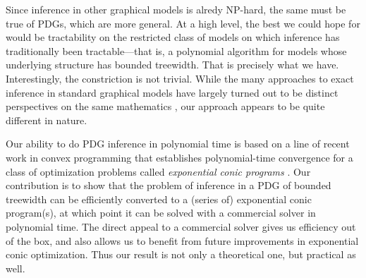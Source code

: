 \documentclass[twoside]{article}
\begin{document}
Since inference in other graphical models is alredy NP-hard, the same must be true of 
PDGs, which are more general.
At a high level, the best we could hope for would be tractability on the restricted
class of models on which inference has traditionally been tractable---that is, a polynomial algorithm for models whose underlying structure has bounded treewidth.
That is precisely what we have.
Interestingly, the constriction is not trivial.
%
While the many approaches to exact inference in standard graphical models have largely turned out to be distinct perspectives 
on the same mathematics \parencite[\S9-11]{koller2009probabilistic},
our approach appears to be quite different in nature.

Our ability to do PDG inference in polynomial time is based on a line of recent work in convex programming that establishes polynomial-time convergence
\parencite{badenbroek2021algorithm,dahl2022primal}
for a class of optimization problems called \emph{exponential conic programs}
\parencite{lubin}.
Our contribution is to show that the problem of inference in a PDG 
of bounded treewidth
can be efficiently converted to a (series of) exponential conic program(s), at which point it can be solved with a commercial solver \parencite{mosek} in polynomial time.
The direct appeal to a commercial solver gives us efficiency out of the box, and also allows us to benefit from future improvements in exponential conic optimization.
Thus our result is not only a theoretical one, but practical as well.
\end{document}
